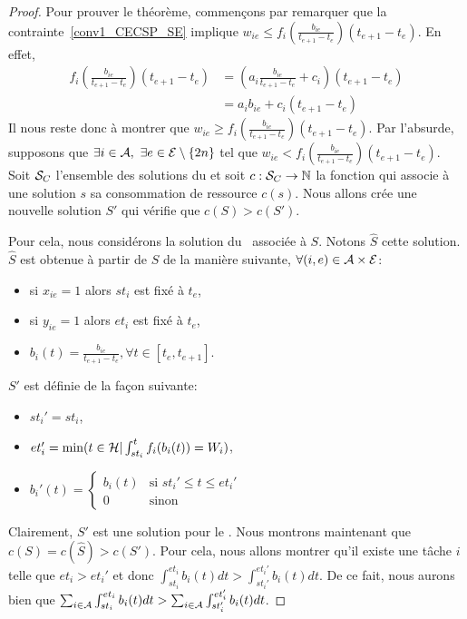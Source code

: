 \begin{proof}
Pour prouver le théorème, commençons par remarquer que la
contrainte~\eqref{conv1_CECSP_SE} implique
$w_{ie} \le f_i\left(\frac{b_{ie}}{t_{e+1}-t_e}\right)(t_{e+1}-t_e)$. En effet, 
\begin{align*}
  f_i\left(\frac{b_{ie}}{t_{e+1}-t_e}\right)(t_{e+1}-t_e)&
  =\left(a_i\frac{b_{ie}}{t_{e+1}-t_e}+c_i\right)(t_{e+1}-t_e)\\  
   &=a_ib_{ie}+c_i(t_{e+1}-t_e)
\end{align*}
Il nous reste donc à montrer que $w_{ie}\ge
f_i\left(\frac{b_{ie}}{t_{e+1}-t_e}\right)(t_{e+1}-t_e)$. Par l'absurde,
supposons que $\exists i \in \A,\ \exists e \in \E\setminus\{2n\}$
tel que $w_{ie} < 
f_i\left(\frac{b_{ie}}{t_{e+1}-t_e}\right)(t_{e+1}-t_e)$. Soit $\S_C$
l'ensemble des solutions du \CECSP et soit  $c :\S_C
\rightarrow \mathbb{N}$ la fonction qui associe à une solution $s$ sa
consommation de ressource $c(s)$. Nous allons crée une nouvelle
solution $S'$ qui vérifie que $c(S)>c(S')$.

Pour cela, nous considérons la solution du \CECSP~associée à
$S$. Notons $\widehat{S}$ cette solution. $\widehat{S}$ est obtenue à
partir de $S$ de la manière suivante, $\forall (i,e)
\in \A \times \E$: 
\begin{itemize}
\item si $x_{ie}=1$ alors $st_i$ est fixé à $t_e$,
\item si $y_{ie}=1$ alors $et_i$ est fixé à $t_e$,
\item $b_i(t)=\frac{b_{ie}}{t_{e+1}-t_e}, \forall t \in [t_e,t_{e+1}]$. 
\end{itemize}

$S'$ est définie de la façon suivante: 
\begin{itemize}
\item $st_i'=st_i$,
\item $et_i'=\min(t \in \H | \int_{st_i}^t f_i(b_i(t)) = W_i)$,
\item $b_i'(t)=\left\{ \begin{array}{ll}
                         b_i(t)& \text{si } st_i' \le t \le et_i'\\ 
                         0 & \text{sinon}
                       \end{array}
                     \right.$
\end{itemize}
Clairement, $S'$ est une solution pour le \CECSP. Nous montrons
maintenant que $c(S) = c(\widehat{S})> c(S')$. Pour cela, nous allons montrer qu'il
existe une tâche $i$ telle que $et_i > et_i'$ et donc
$\int_{st_i}^{et_i} b_i(t)dt > \int_{st_i'}^{et_i'} b_i(t)dt$. De ce
fait, nous aurons bien que $\sum_{i \in \A} \int_{st_i}^{et_i}
b_i(t)dt > \sum_{i \in \A}\int_{st_i'}^{et_i'} b_i(t)dt$. 


\end{proof}
